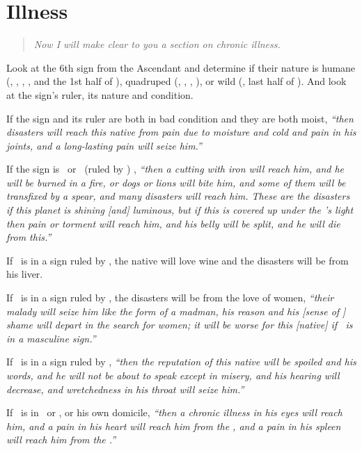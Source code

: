 \section{Illness}
\begin{quote}
\textsl{Now I will make clear to you a section on chronic illness.}
\end{quote}

Look  at the 6th sign from the Ascendant and determine if their nature is humane (\Gemini, \Virgo, \Libra, \Aquarius, and the 1st half of \Sagittarius), quadruped (\Aries, \Taurus, \Leo,  \Capricorn), or wild (\Leo, last half of \Sagittarius). And look at the sign's ruler, its nature and condition.

If  the sign and its ruler are both in bad condition and they are both moist, \textsl{``then disasters will reach this native from pain due to moisture and cold and pain in his joints, and a long-lasting pain will seize him.''}

If  the sign is \Aries\, or \Scorpio\, (ruled by \Mars) , \textsl{``then a cutting with iron will reach him, and he will be burned in a fire, or dogs or lions will bite him, and some of them will be transfixed by a spear, and many disasters will reach him. These are the disasters if this planet is shining [and] luminous, but if this is covered up under the \Sun's light then pain or torment will reach him, and his belly will be split, and he will die from this.''}

If  \Mars\, is in a sign ruled by \Jupiter, the native will love wine and the disasters will be from his liver. 

If \Mars\, is in a sign ruled by \Venus, the disasters will be from the love of women, \textsl{``their malady will seize him like the form of a madman, his reason and his [sense of ] shame will depart in the search for women; it will be worse for this [native] if \Venus\, is in a masculine sign.''}

If \Mars\, is in a sign ruled by \Mercury, \textsl{``then the reputation of this native will be spoiled and his words, and he will not be about to speak except in misery, and his hearing will decrease, and wretchedness in his throat will seize him.''}

If \Mars\, is in \Leo\, or \Cancer, or his own domicile, \textsl{``then a chronic illness in his eyes will reach him, and a pain in his heart will reach him from the \Sun, and a pain in his spleen will reach him from the \Moon.''}

